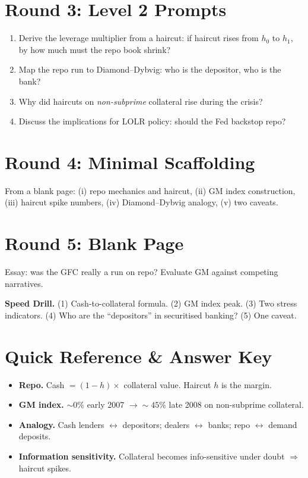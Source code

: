\documentclass[11pt]{article}
\begin{document}
\section*{Round 3: Level 2 Prompts}
\begin{enumerate}
\item Derive the leverage multiplier from a haircut: if haircut rises from $h_0$ to $h_1$, by how much must the repo book shrink?
\item Map the repo run to Diamond--Dybvig: who is the depositor, who is the bank?
\item Why did haircuts on \emph{non-subprime} collateral rise during the crisis?
\item Discuss the implications for LOLR policy: should the Fed backstop repo?
\end{enumerate}

\section*{Round 4: Minimal Scaffolding}
From a blank page: (i) repo mechanics and haircut, (ii) GM index construction, (iii) haircut spike numbers, (iv) Diamond--Dybvig analogy, (v) two caveats.

\section*{Round 5: Blank Page}
Essay: was the GFC really a run on repo? Evaluate GM against competing narratives.

\vspace{6pt}
\begin{drillbox}
\textbf{Speed Drill.} (1) Cash-to-collateral formula. (2) GM index peak. (3) Two stress indicators. (4) Who are the ``depositors'' in securitised banking? (5) One caveat.
\end{drillbox}

\section*{Quick Reference \& Answer Key}
\begin{answerbox}
\begin{itemize}
\item \textbf{Repo.} Cash $=(1-h)\times$ collateral value. Haircut $h$ is the margin.
\item \textbf{GM index.} $\sim 0\%$ early 2007 $\to \sim 45\%$ late 2008 on non-subprime collateral.
\item \textbf{Analogy.} Cash lenders $\leftrightarrow$ depositors; dealers $\leftrightarrow$ banks; repo $\leftrightarrow$ demand deposits.
\item \textbf{Information sensitivity.} Collateral becomes info-sensitive under doubt $\Rightarrow$ haircut spikes.
\end{itemize}
\end{answerbox}
\end{document}
